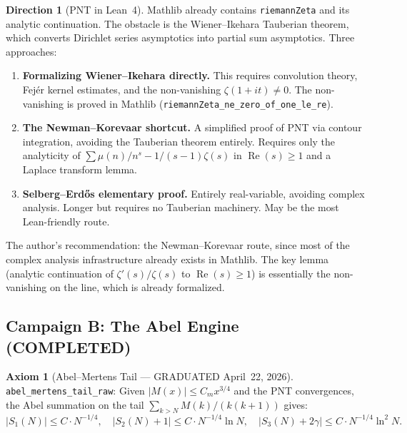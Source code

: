 \documentclass[11pt,a4paper]{article}
\theoremstyle{definition}
\newtheorem{axiombox}[definition]{Axiom}
\newtheorem{direction}[definition]{Direction}
\newcommand{\re}{\operatorname{Re}}
\newcommand{\lean}[1]{\texttt{#1}}
\begin{document}
\begin{direction}[PNT in Lean~4]
Mathlib already contains \lean{riemannZeta} and its analytic continuation.
The obstacle is the Wiener--Ikehara Tauberian theorem, which converts
Dirichlet series asymptotics into partial sum asymptotics. Three approaches:

\begin{enumerate}
  \item \textbf{Formalizing Wiener--Ikehara directly.} This requires
    convolution theory, Fej\'er kernel estimates, and the non-vanishing
    $\zeta(1+it) \neq 0$. The non-vanishing is proved in Mathlib
    (\lean{riemannZeta\_ne\_zero\_of\_one\_le\_re}).

  \item \textbf{The Newman--Korevaar shortcut.} A simplified proof of
    PNT via contour integration, avoiding the Tauberian theorem entirely.
    Requires only the analyticity of $\sum \mu(n)/n^s - 1/(s-1)\zeta(s)$
    in $\re(s) \geq 1$ and a Laplace transform lemma.

  \item \textbf{Selberg--Erd\H{o}s elementary proof.} Entirely real-variable,
    avoiding complex analysis. Longer but requires no Tauberian machinery.
    May be the most Lean-friendly route.
\end{enumerate}

The author's recommendation: the Newman--Korevaar route, since most of the
complex analysis infrastructure already exists in Mathlib. The key lemma
(analytic continuation of $\zeta'(s)/\zeta(s)$ to $\re(s) \geq 1$) is
essentially the non-vanishing on the line, which is already formalized.
\end{direction}

\subsection{Campaign B: The Abel Engine (COMPLETED)}
\label{sec:abel-completed}

\begin{axiombox}[Abel--Mertens Tail --- GRADUATED April~22, 2026]
\lean{abel\_mertens\_tail\_raw}: Given $|M(x)| \le C_m x^{3/4}$ and
the PNT convergences, the Abel summation on the tail
$\sum_{k > N} M(k)/(k(k+1))$ gives:
\[
  |S_1(N)| \le C \cdot N^{-1/4}, \quad
  |S_2(N)+1| \le C \cdot N^{-1/4}\ln N, \quad
  |S_3(N)+2\gamma| \le C \cdot N^{-1/4}\ln^2 N.
\]
\end{axiombox}
\end{document}

